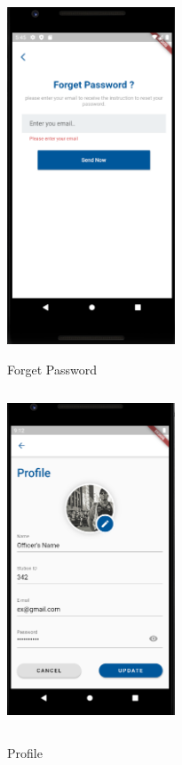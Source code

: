 \documentclass[12pt]{article}
\begin{document}
\begin{figure}[h]

  \begin{minipage}[b]{0.5\textwidth}
    \includegraphics[width=5.0cm, height=10.0cm]{ForgetPass.PNG}
   \caption{Forget Password}
   \label{fig:2}
  \end{minipage}
    \begin{minipage}[b]{0.5\textwidth}
    \includegraphics[width=5.0cm, height=10.0cm]{profile.PNG}
    \label{fig:2}
    \caption{Profile}
  \end{minipage}
      \begin{minipage}[b]{0.5\textwidth}
    \label{fig:2}

\end{minipage}
\end{figure}
\end{document}
